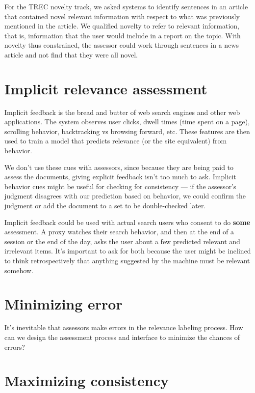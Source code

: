 \documentclass[nobib]{tufte-book}
\begin{document}
For the TREC novelty track, we asked systems to identify sentences in an article that contained novel relevant information with respect to what was previously mentioned in the article.\autocite{soboroff_novelty_2005}  We qualified novelty to refer to relevant information, that is, information that the user would include in a report on the topic.  With novelty thus constrained, the assessor could work through sentences in a news article and not find that they were all novel.

\section{Implicit relevance assessment}

Implicit feedback is the bread and butter of web search engines and other web applications.  The system observes user clicks, dwell times (time spent on a page), scrolling behavior, backtracking vs browsing forward, etc.  These features are then used to train a model that predicts relevance (or the site equivalent) from behavior.

We don't use these cues with assessors, since because they are being paid to assess the documents, giving explicit feedback isn't too much to ask.  Implicit behavior cues might be useful for checking for consistency --- if the assessor's judgment disagrees with our prediction based on behavior, we could confirm the judgment or add the document to a set to be double-checked later.

Implicit feedback could be used with actual search users who consent to do {\bf some} assessment.  A proxy watches their search behavior, and then at the end of a session or the end of the day, asks the user about a few predicted relevant and irrelevant items.  It's important to ask for both because the user might be inclined to think retrospectively that anything suggested by the machine must be relevant somehow.

\section{Minimizing error}

It's inevitable that assessors make errors in the relevance labeling process.  How can we design the assessment process and interface to minimize the chances of errors?

\section{Maximizing consistency}
\end{document}
